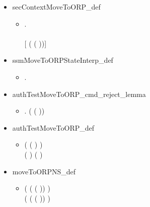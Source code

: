 \begin{itemize}
\item secContextMoveToORP_def
  \begin{itemize}
    \item [] \HOLTokenTurnstile{} \HOLSymConst{\HOLTokenForall{}}.
     \\  \HOLSymConst{=}
     \\ {[    ( ( ))]}
   \end{itemize}
   \item ssmMoveToORPStateInterp_def
  \begin{itemize}
    \item [] \HOLTokenTurnstile{} \HOLSymConst{\HOLTokenForall{}}.   \HOLSymConst{=} 
    \end{itemize}
     \item authTestMoveToORP_cmd_reject_lemma
  \begin{itemize}
    \item [] \HOLTokenTurnstile{} \HOLSymConst{\HOLTokenForall{}}. \HOLSymConst{\HOLTokenNeg{}} ( ( ))
    \end{itemize}
    \item authTestMoveToORP_def
  \begin{itemize}
    \item [] \HOLTokenTurnstile{} ( (    ) \HOLSymConst{\HOLTokenEquiv{}} ) \HOLSymConst{\HOLTokenConj{}}
      \\(  \HOLSymConst{\HOLTokenEquiv{}} ) \HOLSymConst{\HOLTokenConj{}} (  \HOLSymConst{\HOLTokenEquiv{}} )
      \end{itemize}
   \item moveToORPNS_def
  \begin{itemize}
    \item [] \HOLTokenTurnstile{} (  ( ( )) \HOLSymConst{=} ) \HOLSymConst{\HOLTokenConj{}}
   \\(  ( ( )) \HOLSymConst{=} ) \HOLSymConst{\HOLTokenConj{}}

\end{itemize}
\end{itemize}
